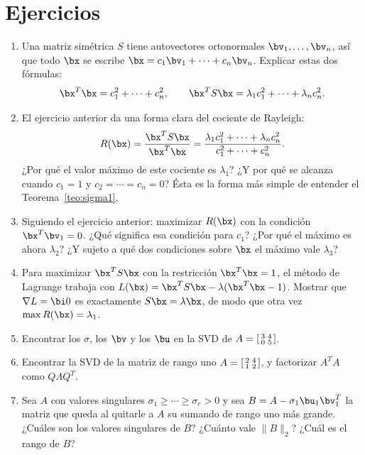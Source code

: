 \section*{Ejercicios}

\begin{enumerate}

\item Una matriz simétrica $S$ tiene autovectores ortonormales
$\bv_1,\dots,\bv_n$, así que todo $\bx$ se escribe
$\bx=c_1\bv_1+\cdots+c_n\bv_n$. Explicar estas dos fórmulas:
\[
\bx^T\bx=c_1^2+\cdots+c_n^2,
\qquad
\bx^TS\bx=\lambda_1c_1^2+\cdots+\lambda_nc_n^2 .
\]

\item El ejercicio anterior da una forma clara del cociente de Rayleigh:
\[
R(\bx)=\frac{\bx^TS\bx}{\bx^T\bx}
=\frac{\lambda_1c_1^2+\cdots+\lambda_nc_n^2}{c_1^2+\cdots+c_n^2} .
\]
¿Por qué el valor máximo de este cociente es $\lambda_1$? ¿Y por qué se
alcanza cuando $c_1=1$ y $c_2=\cdots=c_n=0$? Ésta es la forma más simple de
entender el Teorema~\ref{teo:sigma1}.

\item Siguiendo el ejercicio anterior: maximizar $R(\bx)$ con la condición
$\bx^T\bv_1=0$. ¿Qué significa esa condición para $c_1$? ¿Por qué el máximo
es ahora $\lambda_2$? ¿Y sujeto a qué dos condiciones sobre $\bx$ el máximo
vale $\lambda_3$?

\item Para maximizar $\bx^TS\bx$ con la restricción $\bx^T\bx=1$, el método
de Lagrange trabaja con $L(\bx)=\bx^TS\bx-\lambda(\bx^T\bx-1)$. Mostrar que
$\nabla L=\bi 0$ es exactamente $S\bx=\lambda\bx$, de modo que otra vez
$\max R(\bx)=\lambda_1$.

\item Encontrar los $\sigma$, los $\bv$ y los $\bu$ en la SVD de
$A=\begin{bsmallmatrix}3&4\\ 0&5\end{bsmallmatrix}$.

\item Encontrar la SVD de la matriz de rango uno
$A=\begin{bsmallmatrix}2&4\\ 1&2\end{bsmallmatrix}$, y factorizar $A^TA$
como $Q\Lambda Q^T$.

\item Sea $A$ con valores singulares $\sigma_1\ge\cdots\ge\sigma_r>0$ y sea
$B=A-\sigma_1\bu_1\bv_1^T$ la matriz que queda al quitarle a $A$ su
sumando de rango uno más grande. ¿Cuáles son los valores singulares de $B$?
¿Cuánto vale $\|B\|_2$? ¿Cuál es el rango de $B$?


\end{enumerate}
